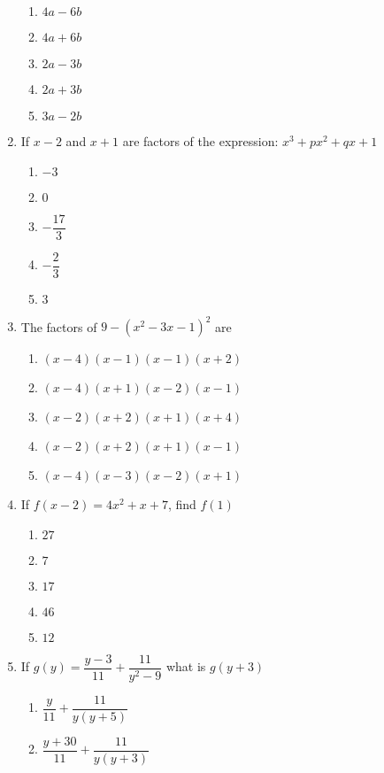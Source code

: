 \begin{multicols}{2}
\begin{enumerate}[label={\arabic*.}]
      \begin{enumerate}[label={\Alph*.}]
        \item \(4a-6b\)
        \item \(4a+6b\)
        \item \(2a-3b\)
        \item \(2a+3b\)
        \item \(3a-2b\)
      \end{enumerate}
    \item If \(x-2\) and \(x+1\) are factors of the expression: \({x}^{3}+p{x}^{2}+qx+1\)
      \begin{enumerate}[label={\Alph*.}]
        \item \(-3\)
        \item \(0\)
        \item \(-\dfrac{17}{3}\)
        \item \(-\dfrac{2}{3}\)
        \item \(3\)
      \end{enumerate}
    \item The factors of \(9 - {\left({x}^{2}-3x-1\right)}^2\) are
      \begin{enumerate}[label={\Alph*.}]
        \item \((x-4)(x-1)(x-1)(x+2)\)
        \item \((x-4)(x+1)(x-2)(x-1)\)
        \item \((x-2)(x+2)(x+1)(x+4)\)
        \item \((x-2)(x+2)(x+1)(x-1)\)
        \item \((x-4)(x-3)(x-2)(x+1)\)
      \end{enumerate}
    \item If \(f(x-2) = 4{x}^{2} + x + 7 \), find \(f(1)\)
      \begin{enumerate}[label={\Alph*.}]
        \item \(27\)
        \item \(7\)
        \item \(17\)
        \item \(46\)
        \item \(12\)
      \end{enumerate}
    \item If \(g(y) = \dfrac{y - 3}{11} + \dfrac{11}{y^2-9}\) what is \(g(y+3)\)
      \begin{enumerate}[label={\Alph*.}]
        \item \(\dfrac{y}{11} + \dfrac{11}{y(y+5)}\)
        \item \(\dfrac{y+30}{11} + \dfrac{11}{y(y+3)}\)

\end{enumerate}
\end{enumerate}
\end{multicols}
